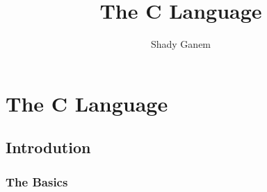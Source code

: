 \documentclass{book}
\title{The C Language}
\author{Shady Ganem}
\begin{document}
\maketitle
\tableofcontents

\part{The C Language}
\chapter{Introdution}
\section{The Basics}
\end{document}
